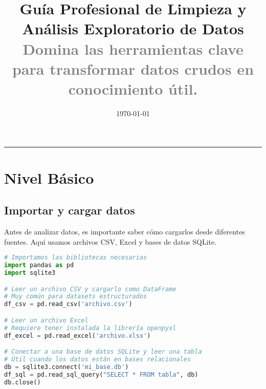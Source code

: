 \documentclass[11pt]{article}
\title{\Huge\textbf{Guía Profesional de Limpieza y Análisis Exploratorio de Datos} \\[1ex]
\large \textcolor{gray}{Domina las herramientas clave para transformar datos crudos en conocimiento útil.}}
\author{}
\date{\today}
\begin{document}
\maketitle
\noindent
\begin{center}
\end{center}

\vspace{-1em}
\begin{center}
\color{gray}\rule{0.9\textwidth}{0.4pt}
\end{center}

\tableofcontents
\newpage

\section*{Nivel Básico}

\subsection*{Importar y cargar datos}
Antes de analizar datos, es importante saber cómo cargarlos desde diferentes fuentes. Aquí usamos archivos CSV, Excel y bases de datos SQLite.

\begin{lstlisting}[language=Python]
# Importamos las bibliotecas necesarias
import pandas as pd
import sqlite3

# Leer un archivo CSV y cargarlo como DataFrame
# Muy común para datasets estructurados
df_csv = pd.read_csv('archivo.csv')

# Leer un archivo Excel
# Requiere tener instalada la librería openpyxl
df_excel = pd.read_excel('archivo.xlsx')

# Conectar a una base de datos SQLite y leer una tabla
# Útil cuando los datos están en bases relacionales
db = sqlite3.connect('mi_base.db')
df_sql = pd.read_sql_query("SELECT * FROM tabla", db)
db.close()
\end{lstlisting}
\end{document}
